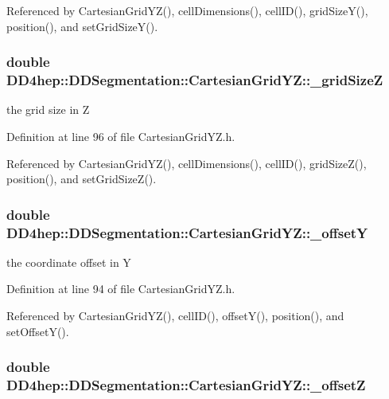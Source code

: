 Referenced by CartesianGridYZ(), cellDimensions(), cellID(), gridSizeY(), position(), and setGridSizeY().\hypertarget{class_d_d4hep_1_1_d_d_segmentation_1_1_cartesian_grid_y_z_a4584ea29126b00ef60c8a75eeda06028}{
\subsubsection[{\_\-gridSizeZ}]{\setlength{\rightskip}{0pt plus 5cm}double {\bf DD4hep::DDSegmentation::CartesianGridYZ::\_\-gridSizeZ}}}
\label{class_d_d4hep_1_1_d_d_segmentation_1_1_cartesian_grid_y_z_a4584ea29126b00ef60c8a75eeda06028}


the grid size in Z 

Definition at line 96 of file CartesianGridYZ.h.

Referenced by CartesianGridYZ(), cellDimensions(), cellID(), gridSizeZ(), position(), and setGridSizeZ().\hypertarget{class_d_d4hep_1_1_d_d_segmentation_1_1_cartesian_grid_y_z_aeb373831f13b0bf9ca5d534b7551cf50}{
\subsubsection[{\_\-offsetY}]{\setlength{\rightskip}{0pt plus 5cm}double {\bf DD4hep::DDSegmentation::CartesianGridYZ::\_\-offsetY}}}
\label{class_d_d4hep_1_1_d_d_segmentation_1_1_cartesian_grid_y_z_aeb373831f13b0bf9ca5d534b7551cf50}


the coordinate offset in Y 

Definition at line 94 of file CartesianGridYZ.h.

Referenced by CartesianGridYZ(), cellID(), offsetY(), position(), and setOffsetY().\hypertarget{class_d_d4hep_1_1_d_d_segmentation_1_1_cartesian_grid_y_z_a4cd904d09e43a33180ef8c0951c99cc7}{
\subsubsection[{\_\-offsetZ}]{\setlength{\rightskip}{0pt plus 5cm}double {\bf DD4hep::DDSegmentation::CartesianGridYZ::\_\-offsetZ}}}
\label{class_d_d4hep_1_1_d_d_segmentation_1_1_cartesian_grid_y_z_a4cd904d09e43a33180ef8c0951c99cc7}


